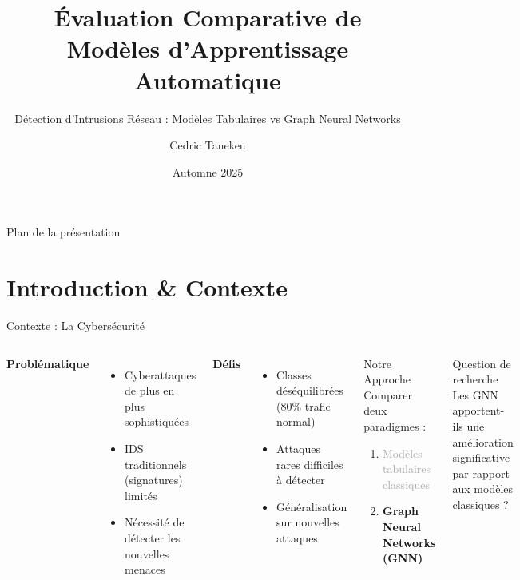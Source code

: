 ﻿\documentclass[aspectratio=169]{beamer}
\title{Évaluation Comparative de Modèles d'Apprentissage Automatique}
\subtitle{Détection d'Intrusions Réseau : Modèles Tabulaires vs Graph Neural Networks}
\author{Cedric Tanekeu}
\institute{Projet de Synthèse}
\date{Automne 2025}
\begin{document}
\begin{frame}
\titlepage
\end{frame}

\begin{frame}{Plan de la présentation}
\tableofcontents
\end{frame}

\section{Introduction \& Contexte}

\begin{frame}{Contexte : La Cybersécurité}
\begin{columns}[T]
\textbf{Problématique}
\begin{itemize}
    \item Cyberattaques de plus en plus sophistiquées
    \item IDS traditionnels (signatures) limités
    \item Nécessité de détecter les nouvelles menaces
\end{itemize}

\vspace{0.5cm}
\textbf{Défis}
\begin{itemize}
    \item Classes déséquilibrées (80\% trafic normal)
    \item Attaques rares difficiles à détecter
    \item Généralisation sur nouvelles attaques
\end{itemize}

\begin{block}{Notre Approche}
Comparer deux paradigmes :
\begin{enumerate}
    \item \textcolor{darkgray}{Modèles tabulaires classiques}
    \item \textcolor{accentorange}{\textbf{Graph Neural Networks (GNN)}}
\end{enumerate}
\end{block}

\vspace{0.3cm}
\begin{alertblock}{Question de recherche}
Les GNN apportent-ils une amélioration significative par rapport aux modèles classiques ?
\end{alertblock}
\end{columns}
\end{frame}
\end{document}
